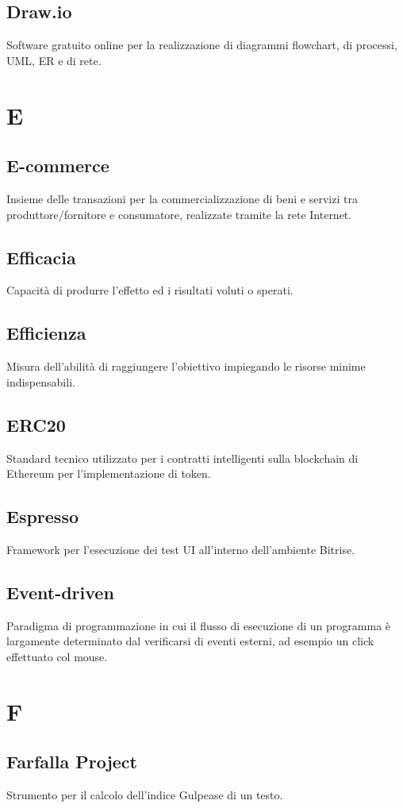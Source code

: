 \subsection*{Draw.io} Software gratuito online per la realizzazione di diagrammi flowchart, di processi, UML, ER e di rete.
\newpage
\section{E}
\subsection*{E-commerce} Insieme delle transazioni per la commercializzazione di beni e servizi tra produttore/fornitore e consumatore, realizzate tramite la rete Internet.
\subsection*{Efficacia} Capacità di produrre l'effetto ed i risultati voluti o sperati.
\subsection*{Efficienza} Misura dell’abilità di raggiungere l’obiettivo impiegando le risorse minime indispensabili.
\subsection*{ERC20} Standard tecnico utilizzato per i contratti intelligenti sulla blockchain di Ethereum per l'implementazione di token.
\subsection*{Espresso} Framework per l’esecuzione dei test UI all’interno dell’ambiente Bitrise.
\subsection*{Event-driven} Paradigma di programmazione in cui il flusso di esecuzione di un programma è largamente determinato dal verificarsi di eventi esterni, ad esempio un click effettuato col mouse.
\newpage
\section{F}
\subsection*{Farfalla Project} Strumento per il calcolo dell'indice Gulpease di un testo.

